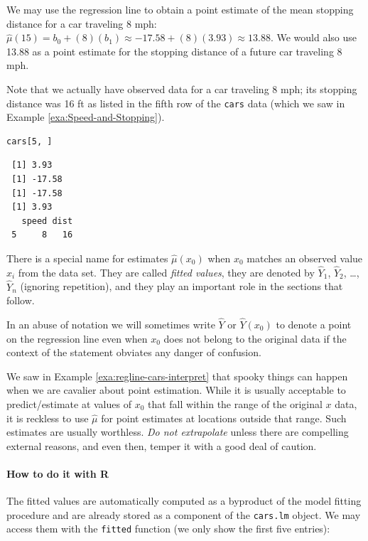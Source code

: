 \documentclass[captions=tableheading]{scrbook}
\begin{document}
\begin{example}
\label{exa:regline-cars-pe-8mph}
We may use the regression line to obtain a point estimate of the mean stopping distance for a car traveling 8 mph: \( \hat{\mu}(15) = b_{0} + (8) (b_{1}) \approx  -17.58 + (8) (  3.93 ) \approx 13.88 \). We would also use 13.88 as a point estimate for the stopping distance of a future car traveling 8 mph. 
\end{example}

Note that we actually have observed data for a car traveling 8 mph; its stopping distance was 16 ft as listed in the fifth row of the \texttt{cars} data (which we saw in Example \ref{exa:Speed-and-Stopping}).


\begin{verbatim}
cars[5, ]
\end{verbatim}

\begin{verbatim}
 [1] 3.93
 [1] -17.58
 [1] -17.58
 [1] 3.93
   speed dist
 5     8   16
\end{verbatim}

There is a special name for estimates \( \hat{\mu}(x_{0}) \) when \( x_{0} \) matches an observed value \(x_{i}\) from the data set. They are called \emph{fitted values}, they are denoted by \(\hat{Y}_{1}\), \(\hat{Y}_{2}\), \ldots{}, \(\hat{Y}_{n}\) (ignoring repetition), and they play an important role in the sections that follow. 

In an abuse of notation we will sometimes write \(\hat{Y}\) or \(\hat{Y}(x_{0})\) to denote a point on the regression line even when \(x_{0}\) does not belong to the original data if the context of the statement obviates any danger of confusion.

We saw in Example \ref{exa:regline-cars-interpret} that spooky things can happen when we are cavalier about point estimation. While it is usually acceptable to predict/estimate at values of \(x_{0}\) that fall within the range of the original \(x\) data, it is reckless to use \(\hat{\mu}\) for point estimates at locations outside that range. Such estimates are usually worthless. \emph{Do not extrapolate} unless there are compelling external reasons, and even then, temper it with a good deal of caution.


\paragraph*{How to do it with \textsf{R}}

The fitted values are automatically computed as a byproduct of the model fitting procedure and are already stored as a component of the \texttt{cars.lm} object. We may access them with the \texttt{fitted} function (we only show the first five entries):
\end{document}
